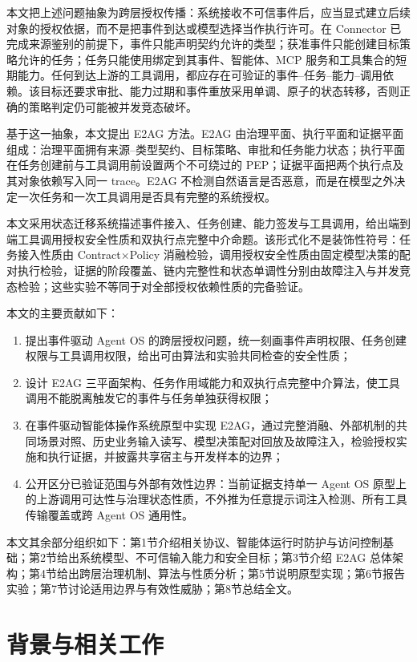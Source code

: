 本文把上述问题抽象为跨层授权传播：系统接收不可信事件后，应当显式建立后续对象的授权依据，而不是把事件到达或模型选择当作执行许可。在 Connector 已完成来源鉴别的前提下，事件只能声明契约允许的类型；获准事件只能创建目标策略允许的任务；任务只能使用绑定到其事件、智能体、MCP 服务和工具集合的短期能力。任何到达上游的工具调用，都应存在可验证的事件--任务--能力--调用依赖。该目标还要求审批、能力过期和事件重放采用单调、原子的状态转移，否则正确的策略判定仍可能被并发竞态破坏。

基于这一抽象，本文提出 E2AG 方法。E2AG 由治理平面、执行平面和证据平面组成：治理平面拥有来源--类型契约、目标策略、审批和任务能力状态；执行平面在任务创建前与工具调用前设置两个不可绕过的 PEP；证据平面把两个执行点及其对象依赖写入同一 trace。E2AG 不检测自然语言是否恶意，而是在模型之外决定一次任务和一次工具调用是否具有完整的系统授权。

本文采用状态迁移系统描述事件接入、任务创建、能力签发与工具调用，给出端到端工具调用授权安全性质和双执行点完整中介命题。该形式化不是装饰性符号：任务接入性质由 Contract$\times$Policy 消融检验，调用授权安全性质由固定模型决策的配对执行检验，证据的阶段覆盖、链内完整性和状态单调性分别由故障注入与并发竞态检验；这些实验不等同于对全部授权依赖性质的完备验证。

本文的主要贡献如下：
\begin{enumerate}
  \item 提出事件驱动 Agent OS 的跨层授权问题，统一刻画事件声明权限、任务创建权限与工具调用权限，给出可由算法和实验共同检查的安全性质；
  \item 设计 E2AG 三平面架构、任务作用域能力和双执行点完整中介算法，使工具调用不能脱离触发它的事件与任务单独获得权限；
  \item 在事件驱动智能体操作系统原型中实现 E2AG，通过完整消融、外部机制的共同场景对照、历史业务输入读写、模型决策配对回放及故障注入，检验授权实施和执行证据，并披露共享宿主与开发样本的边界；
  \item 公开区分已验证范围与外部有效性边界：当前证据支持单一 Agent OS 原型上的上游调用可达性与治理状态性质，不外推为任意提示词注入检测、所有工具传输覆盖或跨 Agent OS 通用性。
\end{enumerate}

本文其余部分组织如下：第1节介绍相关协议、智能体运行时防护与访问控制基础；第2节给出系统模型、不可信输入能力和安全目标；第3节介绍 E2AG 总体架构；第4节给出跨层治理机制、算法与性质分析；第5节说明原型实现；第6节报告实验；第7节讨论适用边界与有效性威胁；第8节总结全文。

\section{背景与相关工作}\label{sec:related-v11}

